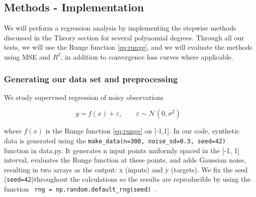 \documentclass[amssymb,twocolumn,aps,floatfix]{revtex4-2}
\begin{document}
\subsection{Methods - Implementation}
\label{section:methods}

We will perform a regression analysis by implementing the stepwise methods discussed in the Theory section for several polynomial degrees. Through all our tests, we will use the Runge function \eqref{eq:runge}, and we will evaluate the methods using MSE and $R^2$, in addition to convergence loss curves where applicable. 


\subsubsection{Generating our data set and preprocessing}
 \label{subsubsec:data_method}

We study supervised regression of noisy observations 

\begin{equation}
    y = f(x) + \varepsilon, \qquad \varepsilon \sim \mathcal{N}(0,\sigma^2)
\end{equation}

where $f(x)$ is the Runge function \eqref{eq:runge} on [-1,1]. In our code, synthetic data is generated using the \texttt{make\_data(n=300, noise\_sd=0.3, seed=42)} function in data.py. It generates n input points uniformly spaced in the [-1, 1] interval, evaluates the Runge function at these points, and adds Gaussian noise, resulting in two arrays as the output: x (inputs) and y (targets). We fix the seed (\texttt{seed=42})throughout the calculations so the results are reproducible by using the function \texttt{ rng = np.random.default\_rng(seed) }.  \\
\end{document}
